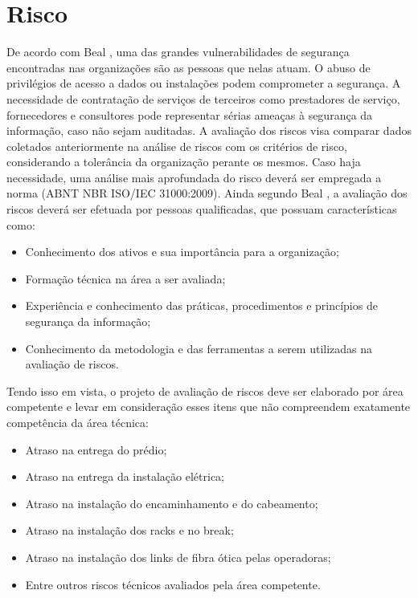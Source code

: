 \documentclass[	DIV=calc,%
							paper=a4,%
							fontsize=12pt,%
							onecolumn]{scrartcl}	 					%
\begin{document}
\section{Risco}
De acordo com Beal \cite{ID2}, uma das grandes vulnerabilidades de segurança encontradas nas organizações são as pessoas que nelas atuam. O abuso de privilégios de acesso a dados ou instalações podem comprometer a segurança. A necessidade de contratação de serviços de terceiros como prestadores de serviço, fornecedores e consultores pode representar sérias ameaças à segurança da informação, caso não sejam auditadas.
A avaliação dos riscos visa comparar dados coletados anteriormente na análise de riscos com os critérios de risco, considerando a tolerância da organização perante os mesmos. Caso haja necessidade, uma análise mais aprofundada do risco deverá ser empregada a norma (ABNT NBR ISO/IEC 31000:2009). Ainda segundo Beal \cite{ID2}, a avaliação dos riscos deverá ser efetuada por pessoas qualificadas, que possuam características como:
\begin{itemize}	
	\item Conhecimento dos ativos e sua importância para a organização; 
	\item Formação técnica na área a ser avaliada;
	\item Experiência e conhecimento das práticas, procedimentos e princípios de segurança da informação;
	\item Conhecimento da metodologia e das ferramentas a serem utilizadas na avaliação de riscos. 
\end{itemize}

Tendo isso em vista, o projeto de avaliação de riscos deve ser elaborado por área competente e levar em consideração esses itens que não compreendem exatamente competência da área técnica:
\begin{itemize}	
	\item Atraso na entrega do prédio; 
	\item Atraso na entrega da instalação elétrica;
	\item Atraso na instalação do encaminhamento e do cabeamento; 
	\item Atraso na instalação dos racks e no break; 
	\item Atraso na instalação dos links de fibra ótica pelas operadoras; 
	\item Entre outros riscos técnicos avaliados pela área competente. 
	
\end{itemize}
\end{document}
